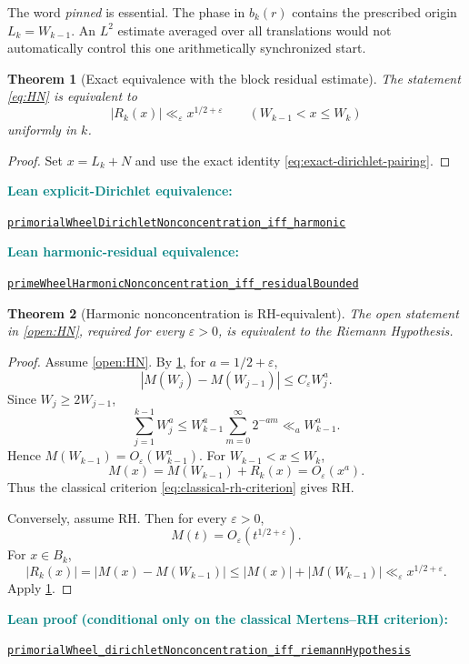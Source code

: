 \documentclass[11pt]{article}
\newtheorem{theorem}{Theorem}[section]
\theoremstyle{definition}
\newcommand{\leanxref}[3]{%
  \par\smallskip
  {\small\noindent\textcolor{teal}{\textbf{#1:}}\par
  \noindent\href{#3}{\nolinkurl{#2}}\par}
  \smallskip
}
\begin{document}
The word \emph{pinned} is essential.  The phase in $b_k(r)$ contains the prescribed origin $L_k=W_{k-1}$.  An $L^2$ estimate averaged over all translations would not automatically control this one arithmetically synchronized start.

\begin{theorem}[Exact equivalence with the block residual estimate]\label{thm:HN-equivalent-residual}
The statement \eqref{eq:HN} is equivalent to
\[
|R_k(x)|\ll_{\varepsilon}x^{1/2+\varepsilon}
\qquad(W_{k-1}<x\le W_k)
\]
uniformly in $k$.
\end{theorem}

\begin{proof}
Set $x=L_k+N$ and use the exact identity \eqref{eq:exact-dirichlet-pairing}.
\end{proof}
\leanxref{Lean explicit-Dirichlet equivalence}{primorialWheelDirichletNonconcentration_iff_harmonic}{https://github.com/OVVO-Financial/prime-wheel-mobius/blob/main/formalization/RHLean/Analysis/PrimorialWheelExplicitCriterion.lean}
\leanxref{Lean harmonic-residual equivalence}{primeWheelHarmonicNonconcentration_iff_residualBounded}{https://github.com/OVVO-Financial/prime-wheel-mobius/blob/main/formalization/RHLean/Analysis/PrimeWheelHarmonicCriterion.lean}

\begin{theorem}[Harmonic nonconcentration is RH-equivalent]\label{thm:HN-RH}
The open statement in \cref{open:HN}, required for every $\varepsilon>0$, is equivalent to the Riemann Hypothesis.
\end{theorem}

\begin{proof}
Assume \cref{open:HN}.  By \cref{thm:HN-equivalent-residual}, for $a=1/2+\varepsilon$,
\[
|M(W_j)-M(W_{j-1})|\le C_{\varepsilon}W_j^a.
\]
Since $W_j\ge2W_{j-1}$,
\[
\sum_{j=1}^{k-1}W_j^a
\le W_{k-1}^a\sum_{m=0}^{\infty}2^{-am}
\ll_a W_{k-1}^a.
\]
Hence $M(W_{k-1})=O_{\varepsilon}(W_{k-1}^a)$.  For $W_{k-1}<x\le W_k$,
\[
M(x)=M(W_{k-1})+R_k(x)
=O_{\varepsilon}(x^a).
\]
Thus the classical criterion \eqref{eq:classical-rh-criterion} gives RH.

Conversely, assume RH.  Then for every $\varepsilon>0$,
\[
M(t)=O_{\varepsilon}(t^{1/2+\varepsilon}).
\]
For $x\in B_k$,
\[
|R_k(x)|=|M(x)-M(W_{k-1})|
\le |M(x)|+|M(W_{k-1})|
\ll_{\varepsilon}x^{1/2+\varepsilon}.
\]
Apply \cref{thm:HN-equivalent-residual}.
\end{proof}
\leanxref{Lean proof (conditional only on the classical Mertens--RH criterion)}{primorialWheel_dirichletNonconcentration_iff_riemannHypothesis}{https://github.com/OVVO-Financial/prime-wheel-mobius/blob/main/formalization/RHLean/Analysis/PublicPrimeWheelReduction.lean}
\end{document}
